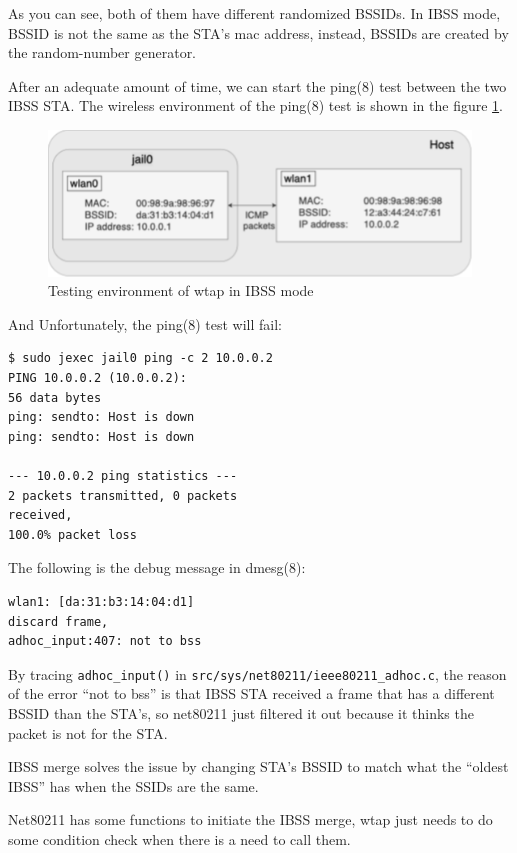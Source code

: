 \documentclass[conference]{IEEEtran}
\begin{document}
As you can see, both of them have different randomized BSSIDs. In IBSS mode, BSSID is not the same as the STA's mac address, instead, BSSIDs are created by the random-number generator.

After an adequate amount of time, we can start the ping(8) test between the two IBSS STA. The wireless environment of the ping(8) test is shown in the figure \ref{fig:IBSS-mac}.

\begin{figure}[h]
\includegraphics[scale=0.4]{ping-mac-horizontal-modified.png}
\caption{Testing environment of wtap in IBSS mode}
\label{fig:IBSS-mac}
\end{figure}

And Unfortunately, the ping(8) test will fail:

\begin{lstlisting}
$ sudo jexec jail0 ping -c 2 10.0.0.2
PING 10.0.0.2 (10.0.0.2): 
56 data bytes
ping: sendto: Host is down
ping: sendto: Host is down

--- 10.0.0.2 ping statistics ---
2 packets transmitted, 0 packets 
received, 
100.0% packet loss
\end{lstlisting}

The following is the debug message in dmesg(8):

\begin{lstlisting}
wlan1: [da:31:b3:14:04:d1] 
discard frame, 
adhoc_input:407: not to bss
\end{lstlisting}

By tracing \lstinline{adhoc_input()} in \lstinline{src/sys/net80211/ieee80211_adhoc.c}, the reason of the error “not to bss” is that IBSS STA received a frame that has a different BSSID than the STA’s, so net80211 just filtered it out because it thinks the packet is not for the STA.

IBSS merge solves the issue by changing STA's BSSID to match what the “oldest IBSS” has when the SSIDs are the same.

Net80211 has some functions to initiate the IBSS merge, wtap just needs to do some condition check when there is a need to call them.
\end{document}
